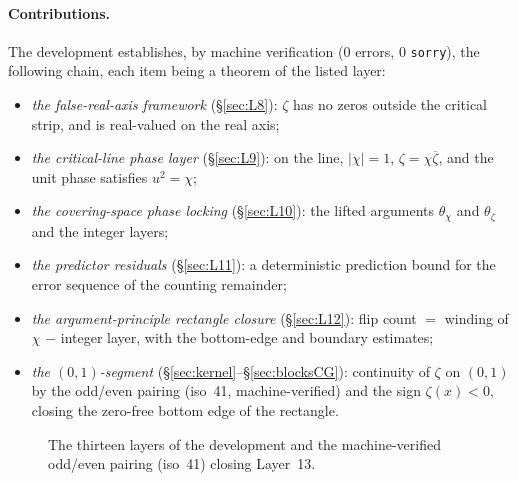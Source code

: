 \documentclass{article}
\newcommand{\zt}{\zeta}
\newcommand{\Xchi}{\chi}
\begin{document}
\paragraph{Contributions.} The development establishes, by machine
verification (0 errors, 0 \texttt{sorry}), the following chain, each
item being a theorem of the listed layer:
\begin{itemize}
\item \emph{the false-real-axis framework} (\S\ref{sec:L8}): $\zt$ has no
zeros outside the critical strip, and is real-valued on the real axis;
\item \emph{the critical-line phase layer} (\S\ref{sec:L9}): on the line,
$|\Xchi|=1$, $\zt=\Xchi\overline{\zt}$, and the unit phase satisfies
$u^2=\Xchi$;
\item \emph{the covering-space phase locking} (\S\ref{sec:L10}): the
lifted arguments $\theta_\Xchi$ and $\theta_{\zt}$ and the integer layers;
\item \emph{the predictor residuals} (\S\ref{sec:L11}): a deterministic
prediction bound for the error sequence of the counting remainder;
\item \emph{the argument-principle rectangle closure} (\S\ref{sec:L12}):
flip count $=$ winding of $\Xchi$ $-$ integer layer, with the bottom-edge
and boundary estimates;
\item \emph{the $(0,1)$-segment} (\S\ref{sec:kernel}--\S\ref{sec:blocksCG}):
continuity of $\zt$ on $(0,1)$ by the odd/even pairing (iso~41,
machine-verified) and the sign $\zt(x)<0$, closing the zero-free bottom
edge of the rectangle.
\end{itemize}

\begin{figure}[h]
\centering
{}
\caption{The thirteen layers of the development and the machine-verified
odd/even pairing (iso~41) closing Layer~13.}
\label{fig:map}
\end{figure}
\end{document}
